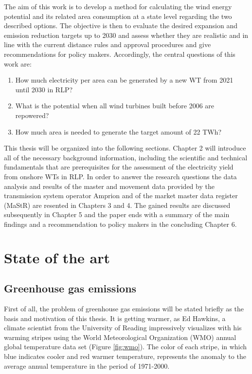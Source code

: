 \documentclass[a4paper,11pt]{article}
\begin{document}
The aim of this work is to develop a method for calculating the wind energy potential and its related area consumption at a state level regarding the two described options. The objective is then to evaluate the desired expansion and emission reduction targets up to 2030 and assess whether they are realistic and in line with the current distance rules and approval procedures and give recommendations for policy makers. Accordingly, the central questions of this work are:
\begin{enumerate}
\def\labelenumi{\arabic{enumi}.}
\item
  How much electricity per area can be generated by a new WT from 2021 until 2030 in RLP?
\item
  What is the potential when all wind turbines built before 2006 are repowered?
\item
  How much area is needed to generate the target amount of 22 TWh?
\end{enumerate}
This thesis will be organized into the following sections. Chapter 2 will introduce all of the necessary background information, including the scientific and technical fundamentals that are prerequisites for the assessment of the electricity yield from onshore WTs in RLP. In order to answer the research questions the data analysis and results of the master and movement data provided by the transmission system operator Amprion and of the market master data register (MaStR) are resented in Chapters 3 and 4. The gained results are discussed subsequently in Chapter 5 and the paper ends with a summary of the main findings and a recommendation to policy makers in the concluding Chapter 6.

\newpage

\hypertarget{state-of-the-art}{%
\section{State of the art}\label{state-of-the-art}}

\hypertarget{greenhouse-gas-emissions}{%
\subsection{Greenhouse gas emissions}\label{greenhouse-gas-emissions}}

First of all, the problem of greenhouse gas emissions will be stated briefly as the basis and motivation of this thesis. It is getting warmer, as Ed Hawkins, a climate scientist from the University of Reading impressively visualizes with his warming stripes using the World Meteorological Organization (WMO) annual global temperature data set (Figure \ref{fig:wmo}). The color of each stripe, in which blue indicates cooler and red warmer temperature, represents the anomaly to the average annual temperature in the period of 1971-2000.
\end{document}
